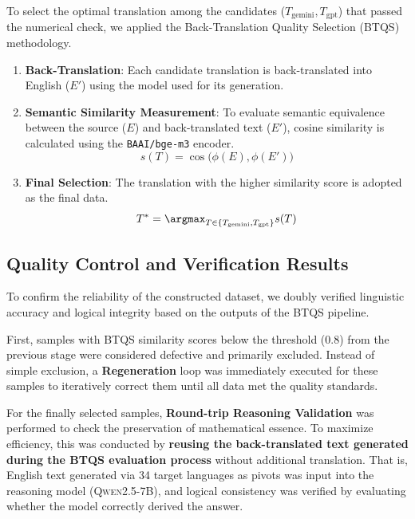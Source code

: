 To select the optimal translation among the candidates ($T_{\text{gemini}}, T_{\text{gpt}}$) that passed the numerical check, we applied the Back-Translation Quality Selection (BTQS) methodology.

\begin{enumerate}
    \item \textbf{Back-Translation}: Each candidate translation is back-translated into English ($E'$) using the model used for its generation.
    \item \textbf{Semantic Similarity Measurement}: To evaluate semantic equivalence between the source ($E$) and back-translated text ($E'$), cosine similarity is calculated using the \texttt{BAAI/bge-m3} encoder.
    \begin{equation}
        s(T) = \cos\big(\phi(E), \phi(E')\big)
    \end{equation}
    \item \textbf{Final Selection}: The translation with the higher similarity score is adopted as the final data.
    \begin{equation}
        T^* = \argmax_{T \in \{T_{\text{gemini}}, T_{\text{gpt}}\}} s(T)
    \end{equation}
\end{enumerate}

\subsection{Quality Control and Verification Results}
\label{subsec:quality_control}

To confirm the reliability of the constructed dataset, we doubly verified linguistic accuracy and logical integrity based on the outputs of the BTQS pipeline.

First, samples with BTQS similarity scores below the threshold ($0.8$) from the previous stage were considered defective and primarily excluded. Instead of simple exclusion, a \textbf{Regeneration} loop was immediately executed for these samples to iteratively correct them until all data met the quality standards.

For the finally selected samples, \textbf{Round-trip Reasoning Validation} was performed to check the preservation of mathematical essence. To maximize efficiency, this was conducted by \textbf{reusing the back-translated text generated during the BTQS evaluation process} without additional translation. That is, English text generated via 34 target languages as pivots was input into the reasoning model (\textsc{Qwen2.5-7B}), and logical consistency was verified by evaluating whether the model correctly derived the answer.


